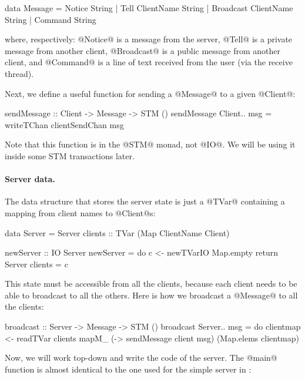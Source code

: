 \begin{haskell}
data Message = Notice String
             | Tell ClientName String
             | Broadcast ClientName String
             | Command String
\end{haskell}

\noindent where, respectively: @Notice@ is a message from the server,
@Tell@ is a private message from another client, @Broadcast@ is a
public message from another client, and @Command@ is a line of text
received from the user (via the receive thread).

Next, we define a useful function for sending a @Message@ to a given
@Client@:

\begin{haskell}
sendMessage :: Client -> Message -> STM ()
sendMessage Client{..} msg =
    writeTChan clientSendChan msg
\end{haskell}

\noindent Note that this function is in the @STM@ monad, not @IO@.  We
will be using it inside some STM transactions later.

\paragraph{Server data.} The data structure that stores the server state is just a @TVar@
containing a mapping from client names to @Client@s:

\begin{haskell}
data Server = Server
  { clients :: TVar (Map ClientName Client)
  }

newServer :: IO Server
newServer = do
  c <- newTVarIO Map.empty
  return Server { clients = c }
\end{haskell}

This state must be accessible from all the clients, because each
client needs to be able to broadcast to all the others.  Here is how
we broadcast a @Message@ to all the clients:

\begin{haskell}
broadcast :: Server -> Message -> STM ()
broadcast Server{..} msg = do
    clientmap <- readTVar clients
    mapM_ (\client -> sendMessage client msg) (Map.elems clientmap)
\end{haskell}

Now, we will work top-down and write the code of the server.  The
@main@ function is almost identical to the one used for the simple
server in :

